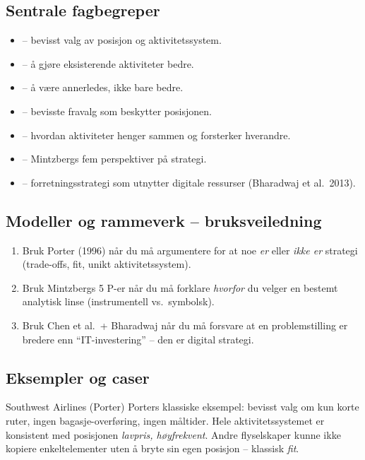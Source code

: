 \subsection{Sentrale fagbegreper}\label{terms:lec01}
\begin{itemize}
  \item {} -- bevisst valg av posisjon og aktivitetssystem.
  \item {} -- å gjøre eksisterende aktiviteter bedre.
  \item {} -- å være annerledes, ikke bare bedre.
  \item {} -- bevisste fravalg som beskytter posisjonen.
  \item {} -- hvordan aktiviteter henger sammen og forsterker hverandre.
  \item {} -- Mintzbergs fem perspektiver på strategi.
  \item {} -- forretningsstrategi som utnytter digitale
    ressurser (Bharadwaj et al.\ 2013).
\end{itemize}

\subsection{Modeller og rammeverk -- bruksveiledning}

\begin{enumerate}
  \item Bruk Porter (1996) når du må argumentere for at noe \emph{er} eller
    \emph{ikke er} strategi (trade-offs, fit, unikt aktivitetssystem).
  \item Bruk Mintzbergs 5 P-er når du må forklare \emph{hvorfor} du velger en
    bestemt analytisk linse (instrumentell vs.\ symbolsk).
  \item Bruk Chen et al.\ + Bharadwaj når du må forsvare at en problemstilling
    er bredere enn ``IT-investering'' -- den er digital strategi.
\end{enumerate}

\subsection{Eksempler og caser}
\begin{eksempelboks}{Southwest Airlines (Porter)}
Porters klassiske eksempel: bevisst valg om kun korte ruter, ingen
bagasje-overføring, ingen måltider. Hele aktivitetssystemet er konsistent med
posisjonen \emph{lavpris, høyfrekvent}. Andre flyselskaper kunne ikke kopiere
enkeltelementer uten å bryte sin egen posisjon -- klassisk \emph{fit}.
\end{eksempelboks}

